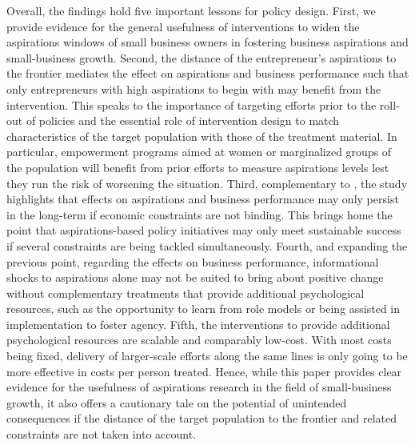 \documentclass[11.5pt]{article}
\begin{document}
Overall, the findings hold five important lessons for policy design. First, we provide evidence for the general usefulness of interventions to widen the aspirations windows of small business owners in fostering business aspirations and small-business growth. Second, the distance of the entrepreneur's aspirations to the frontier mediates the effect on aspirations and business performance such that only entrepreneurs with high aspirations to begin with may benefit from the intervention. This speaks to the importance of targeting efforts prior to the roll-out of policies and the essential role of intervention design to match characteristics of the target population with those of the treatment material. In particular, empowerment programs aimed at women or marginalized groups of the population will benefit from prior efforts to measure aspirations levels lest they run the risk of worsening the situation. Third, complementary to \citet{Galiani2018}, the study highlights that effects on aspirations and business performance may only persist in the long-term if economic constraints are not binding. This brings home the point that aspirations-based policy initiatives may only meet sustainable success if several constraints are being tackled simultaneously. Fourth, and expanding the previous point, regarding the effects on business performance, informational shocks to aspirations alone may not be suited to bring about positive change without complementary treatments that provide additional psychological resources, such as the opportunity to learn from role models or being assisted in implementation to foster agency. Fifth, the interventions to provide additional psychological resources are scalable and comparably low-cost. With most costs being fixed, delivery of larger-scale efforts along the same lines is only going to be more effective in costs per person treated. Hence, while this paper provides clear evidence for the usefulness of aspirations research in the field of small-business growth, it also offers a cautionary tale on the potential of unintended consequences if the distance of the target population to the frontier and related constraints are not taken into account. %




\pagebreak


\end{document}
